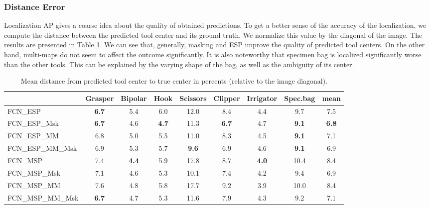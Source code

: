 \documentclass[english,runningheads,a4paper]{llncs}
\begin{document}
\subsubsection{Distance Error}
Localization AP gives a coarse idea about the quality of obtained predictions. To get a better sense of the accuracy of the localization, we compute the distance between the predicted tool center and its ground truth. We normalize this value by the diagonal of the image. The results are presented in Table \ref{tab:dist}. We can see that, generally, masking and ESP improve the quality of predicted tool centers. On the other hand, multi-maps do not seem to affect the outcome significantly. It is also noteworthy that specimen bag is localized significantly worse than the other tools. This can be explained by the varying shape of the bag, as well as the ambiguity of its center.
\begin{table}[t]
\centering
\begin{tabular}{|l|c|c|c|c|c|c|c|c|}
\hline
             & Grasper & Bipolar & Hook & Scissors & Clipper & Irrigator & Spec.bag & \textbf{mean} \\ \hline
FCN\_ESP & \textbf{6.7} & 5.4 & 6.0 & 12.0 &  8.4 & 4.4 &  9.7 & 7.5 \\ \hline
FCN\_ESP\_Msk & \textbf{6.7} & 4.6 & \textbf{4.7} & 11.3 &  \textbf{6.7} & 4.7 &  \textbf{9.1} & \textbf{6.8} \\ \hline
FCN\_ESP\_MM  & 6.8 & 5.0 & 5.5 & 11.0 &  8.3 & 4.5 &  \textbf{9.1} & 7.1 \\ \hline
FCN\_ESP\_MM\_Msk & 6.9 & 5.3 & 5.7 & \textbf{ 9.6} &  6.9 & 4.6 &  \textbf{9.1} & 6.9 \\ \hline
FCN\_MSP     & 7.4 & \textbf{4.4} & 5.9 & 17.8 & 8.7 & \textbf{4.0} & 10.4 & 8.4 \\ \hline
FCN\_MSP\_Msk & 7.1 & 4.6 & 5.3 & 10.1 & 7.4 & 4.2 & 9.4 & 6.9 \\ \hline
FCN\_MSP\_MM     & 7.6 & 4.8 & 5.8 & 17.7 & 9.2 & 3.9 & 10.0 & 8.4 \\ \hline
FCN\_MSP\_MM\_Msk & \textbf{6.7} & 4.7 & 5.3 & 11.6 & 7.9 & 4.3 & 9.2 & 7.1 \\ \hline
\end{tabular}
\smallskip
\caption{Mean distance from predicted tool center to true center in percents (relative to the image diagonal).}
\label{tab:dist}
\end{table}
\end{document}
